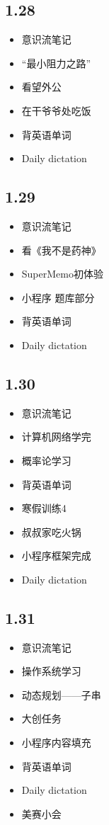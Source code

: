 \documentclass[UTF8]{ctexart}
\begin{document}
\subsection*{1.28}
\begin{itemize}
    \item 意识流笔记
    \item “最小阻力之路”
    \item 看望外公
    \item 在干爷爷处吃饭
    \item 背英语单词
    \item Daily dictation
\end{itemize}
\subsection*{1.29}
\begin{itemize}
    \item 意识流笔记
    \item 看《我不是药神》
    \item SuperMemo初体验
    \item 小程序 题库部分
    \item 背英语单词
    \item Daily dictation
\end{itemize}
\subsection*{1.30}
\begin{itemize}
    \item 意识流笔记
    \item 计算机网络学完
    \item 概率论学习
    \item 背英语单词
    \item 寒假训练4
    \item 叔叔家吃火锅
    \item 小程序框架完成
    \item Daily dictation
\end{itemize}
\subsection*{1.31}
\begin{itemize}
    \item 意识流笔记
    \item 操作系统学习
    \item 动态规划——子串
    \item 大创任务
    \item 小程序内容填充
    \item 背英语单词
    \item Daily dictation
    \item 美赛小会
\end{itemize}
\end{document}

